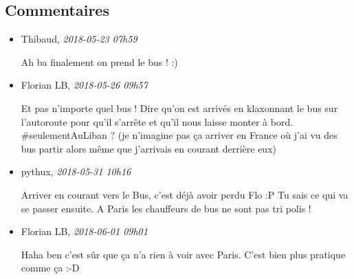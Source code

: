 \documentclass[]{article}
\date{}
\begin{document}
\hypertarget{commentaires}{%
\subsection{Commentaires}\label{commentaires}}

\begin{itemize}
\item
  Thibaud, \emph{2018-05-23 07h59}

  Ah ba finalement on prend le bus ! :)
\item
  Florian LB, \emph{2018-05-26 09h57}

  Et pas n'importe quel bus ! Dire qu'on est arrivés en klaxonnant le
  bus sur l'autoroute pour qu'il s'arrête et qu'il nous laisse monter à
  bord. \#seulementAuLiban ? (je n'imagine pas ça arriver en France où
  j'ai vu des bus partir alors même que j'arrivais en courant derrière
  eux)
\item
  pythux, \emph{2018-05-31 10h16}

  Arriver en courant vers le Bus, c'est déjà avoir perdu Flo :P Tu sais
  ce qui va se passer ensuite. A Paris les chauffeurs de bus ne sont pas
  tri polis !
\item
  Florian LB, \emph{2018-06-01 09h01}

  Haha ben c'est sûr que ça n'a rien à voir avec Paris. C'est bien plus
  pratique comme ça :-D
\end{itemize}
\end{document}
